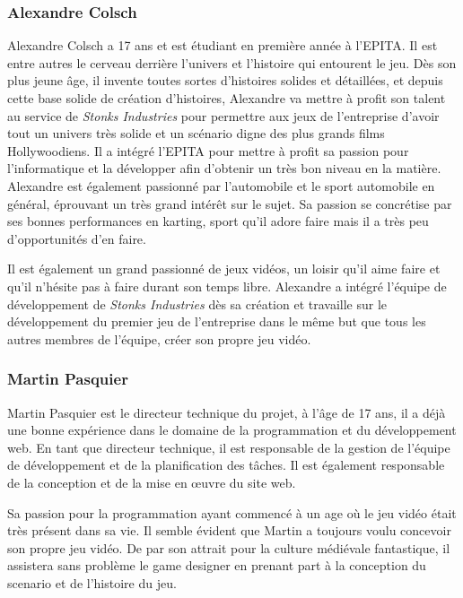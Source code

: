 \subsubsection*{Alexandre Colsch}

Alexandre Colsch a 17 ans et est étudiant en première année à l’EPITA.
Il est entre autres le cerveau derrière l’univers et l’histoire qui entourent le jeu.
Dès son plus jeune âge, il invente toutes sortes d’histoires solides et détaillées, et depuis cette base solide de création d’histoires, 
Alexandre va mettre à profit son talent au service de \textit{Stonks Industries} pour permettre aux jeux de l’entreprise d’avoir tout un univers très solide et un scénario digne des plus grands films Hollywoodiens.
Il a intégré l’EPITA pour mettre à profit sa passion pour l’informatique et la développer afin d’obtenir un très bon niveau en la matière.
Alexandre est également passionné par l’automobile et le sport automobile en général, éprouvant un très grand intérêt sur le sujet.
Sa passion se concrétise par ses bonnes performances en karting, sport qu’il adore faire mais il a très peu d'opportunités d’en faire.

Il est également un grand passionné de jeux vidéos, un loisir qu’il aime faire et qu’il n'hésite pas à faire durant son temps libre.
Alexandre a intégré l'équipe de développement de \textit{Stonks Industries} dès sa création et travaille sur le développement du premier jeu de l’entreprise dans le même but que tous les autres membres de l'équipe, créer son propre jeu vidéo.

\subsubsection*{Martin Pasquier}
    
Martin Pasquier est le directeur technique du projet, à l'âge de 17 ans, il a déjà une bonne expérience dans le domaine de la programmation et du développement web.   
En tant que directeur technique, il est responsable de la gestion de l'équipe de développement et de la planification des tâches.
Il est également responsable de la conception et de la mise en œuvre du site web.

Sa passion pour la programmation ayant commencé à un age où le jeu vidéo était très présent dans sa vie.
Il semble évident que Martin a toujours voulu concevoir son propre jeu vidéo.
De par son attrait pour la culture médiévale fantastique, il assistera sans problème le game designer en prenant part à la conception du scenario et de l'histoire du jeu.

